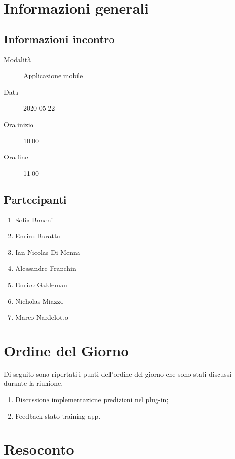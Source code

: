 \documentclass{article}
\begin{document}


\section{Informazioni generali}%
\label{sec:informazioni_generali}

\subsection{Informazioni incontro}%
\label{sub:informazioni_incontro}

\begin{description}
  \item[Modalità] Applicazione mobile 
  \item[Data] 2020-05-22
  \item[Ora inizio] 10:00
  \item[Ora fine] 11:00
\end{description}

\subsection{Partecipanti}%
\label{sub:partecipanti}

\begin{enumerate}
  \item Sofia Bononi
  \item Enrico Buratto
  \item Ian Nicolas Di Menna
  \item Alessandro Franchin
  \item Enrico Galdeman
  \item Nicholas Miazzo
  \item Marco Nardelotto
\end{enumerate}

\section{Ordine del Giorno}%
\label{ordine_del_giorno}
Di seguito sono riportati i punti dell'ordine del giorno che sono stati discussi durante la riunione.
\begin{enumerate}
  \item Discussione implementazione predizioni nel plug-in;
  \item Feedback stato training app.
\end{enumerate}

\section{Resoconto}%
\label{resoconto}
\end{document}
